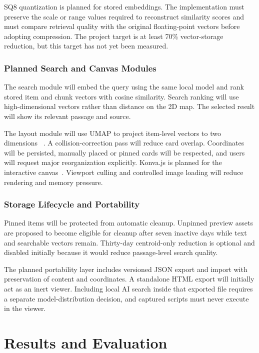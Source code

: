 \documentclass{tietreport}
\begin{document}
SQ8 quantization is planned for stored embeddings. The implementation must preserve the scale
or range values required to reconstruct similarity scores and must compare retrieval quality
with the original floating-point vectors before adopting compression. The project target is
at least 70\% vector-storage reduction, but this target has not yet been measured.

\subsection{Planned Search and Canvas Modules}

The search module will embed the query using the same local model and rank stored item and
chunk vectors with cosine similarity. Search ranking will use high-dimensional vectors rather
than distance on the 2D map. The selected result will show its relevant passage and source.

The layout module will use UMAP to project item-level vectors to two dimensions
~\cite{umap,umapjs}. A collision-correction pass will reduce card overlap. Coordinates will be
persisted, manually placed or pinned cards will be respected, and users will request major
reorganization explicitly. Konva.js is planned for the interactive canvas~\cite{konva}.
Viewport culling and controlled image loading will reduce rendering and memory pressure.

\subsection{Storage Lifecycle and Portability}

Pinned items will be protected from automatic cleanup. Unpinned preview assets are proposed
to become eligible for cleanup after seven inactive days while text and searchable vectors
remain. Thirty-day centroid-only reduction is optional and disabled initially because it
would reduce passage-level search quality.

The planned portability layer includes versioned JSON export and import with preservation of
content and coordinates. A standalone HTML export will initially act as an inert viewer.
Including local AI search inside that exported file requires a separate model-distribution
decision, and captured scripts must never execute in the viewer.


\chapter{Results and Evaluation}
\end{document}
